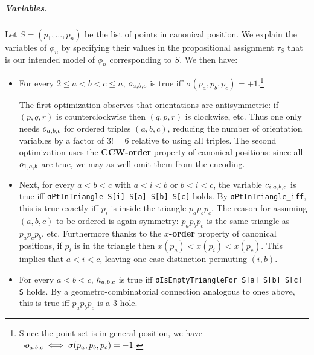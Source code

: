 \subparagraph*{Variables.}
Let $S = (p_1, \ldots, p_n)$ be the list of points in canonical position.
We explain the variables of $\phi_n$
by specifying their values in the propositional assignment $\tau_S$
that is our intended model of $\phi_n$
corresponding to $S$. We then have:
\begin{itemize}
  \item
    For every $2 \leq a < b < c \leq n$, $\orvar_{a,b,c}$ is true
    iff $\sigma(p_a,p_b,p_c) = +1$.\footnote{
    Since the point set is in general position,
    we have $\neg \orvar_{a,b,c} \iff \sigma(p_a, p_b, p_c) = -1$.}

    The first optimization observes that orientations are antisymmetric:
    if $(p,q,r)$ is counterclockwise then $(q,p,r)$ is clockwise, etc.
    Thus one only needs $\orvar_{a,b,c}$ for ordered triples $(a,b,c)$,
    reducing the number of orientation variables by a factor of $3! = 6$
    relative to using all triples. The second optimization uses the \textbf{CCW-order} property of canonical positions:
    since all $\orvar_{1,a,b}$ are true, we may as well omit them from the encoding.

  \item
    Next, for every $a < b < c$ with $a < i < b$ or $b < i < c$,
    the variable $\cvar_{i;a,b,c}$ is true
    iff \lstinline|σPtInTriangle S[i] S[a] S[b] S[c]| holds.
    By \lstinline|σPtInTriangle_iff|, this is true exactly
    iff $p_i$ is inside the triangle $p_ap_bp_c$.
    The reason for assuming $(a,b,c)$ to be ordered is again symmetry:
    $p_ap_bp_c$ is the same triangle as $p_ap_cp_b$, etc.
    Furthermore thanks to the \textbf{$x$-order} property of canonical positions,
    if $p_i$ is in the triangle
    then $x(p_a) < x(p_i) < x(p_c)$.
    This implies that $a < i < c$,
    leaving one case distinction permuting $(i,b)$.

  \item
    For every $a < b < c$,
    $\hvar_{a,b,c}$ is true
    iff \lstinline|σIsEmptyTriangleFor S[a] S[b] S[c] S| holds.
    By a geometro-combinatorial connection analogous to ones above,
    this is true iff $p_ap_bp_c$ is a $3$-hole.


\end{itemize}
